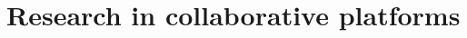 \section{Research in collaborative platforms} \label{s:introduction:research-in-collaborative-platforms}